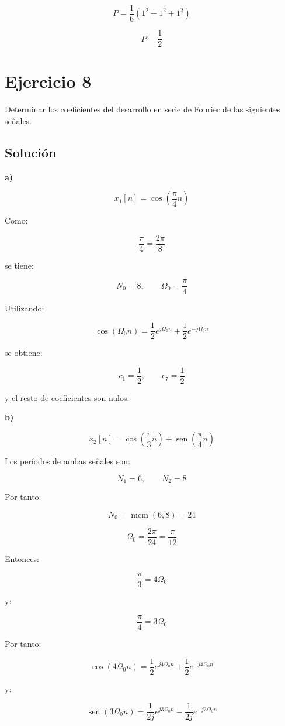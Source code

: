 \documentclass[fleqn]{article}
\DeclareMathOperator{\sen}{sen}
\begin{document}
	\[
	P
	=
	\frac{1}{6}
	\left(
	1^2+1^2+1^2
	\right)
	\]

	\[
	\boxed{
	P=\frac{1}{2}
	}
	\]

\section{Ejercicio 8}
	Determinar los coeficientes del desarrollo en serie de Fourier de las siguientes señales.

	\subsection{Solución}

	\textbf{a)}

	\[
	x_1[n]
	=
	\cos\left(\frac{\pi}{4}n\right)
	\]

	Como:

	\[
	\frac{\pi}{4}
	=
	\frac{2\pi}{8}
	\]

	se tiene:

	\[
	N_0=8,
	\qquad
	\Omega_0=\frac{\pi}{4}
	\]

	Utilizando:

	\[
	\cos(\Omega_0n)
	=
	\frac{1}{2}e^{j\Omega_0n}
	+
	\frac{1}{2}e^{-j\Omega_0n}
	\]

	se obtiene:

	\[
	\boxed{
	c_1=\frac{1}{2},
	\qquad
	c_7=\frac{1}{2}
	}
	\]

	y el resto de coeficientes son nulos.

	\textbf{b)}

	\[
	x_2[n]
	=
	\cos\left(\frac{\pi}{3}n\right)
	+
	\sen\left(\frac{\pi}{4}n\right)
	\]

	Los períodos de ambas señales son:

	\[
	N_1=6,
	\qquad
	N_2=8
	\]

	Por tanto:

	\[
	N_0
	=
	\operatorname{mcm}(6,8)
	=
	24
	\]

	\[
	\Omega_0
	=
	\frac{2\pi}{24}
	=
	\frac{\pi}{12}
	\]

	Entonces:

	\[
	\frac{\pi}{3}=4\Omega_0
	\]

	y:

	\[
	\frac{\pi}{4}=3\Omega_0
	\]

	Por tanto:

	\[
	\cos(4\Omega_0n)
	=
	\frac{1}{2}e^{j4\Omega_0n}
	+
	\frac{1}{2}e^{-j4\Omega_0n}
	\]

	y:

	\[
	\sen(3\Omega_0n)
	=
	\frac{1}{2j}e^{j3\Omega_0n}
	-
	\frac{1}{2j}e^{-j3\Omega_0n}
	\]
\end{document}
